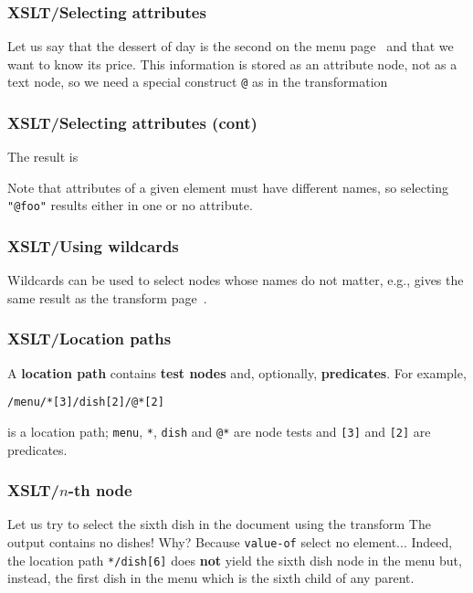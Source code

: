 %
\begin{frame}[containsverbatim]
\frametitle{XSLT/Selecting attributes}
\label{index}

Let us say that the dessert of day is the second on the menu
page~\pageref{menu} and that we want to know its price. This
information is stored as an attribute node, not as a text node, so we
need a special construct \verb|@| as in the transformation

\end{frame}

%
\begin{frame}[containsverbatim]
\frametitle{XSLT/Selecting attributes (cont)}

The result is

\bigskip

Note that attributes of a given element must have different names, so
selecting \verb|"@foo"| results either in one or no attribute.

\end{frame}

%
\begin{frame}
\frametitle{XSLT/Using wildcards}

Wildcards can be used to select nodes whose names do not matter, e.g.,
 gives the same result as the transform
page~\pageref{index}.

\end{frame}

%
\begin{frame}[containsverbatim]
\frametitle{XSLT/Location paths}

A \textbf{location path} contains \textbf{test nodes} and, optionally,
\textbf{predicates}. For example,
\begin{verbatim}
/menu/*[3]/dish[2]/@*[2]
\end{verbatim}
is a location path; \verb|menu|, \verb|*|, \verb|dish| and \verb|@*|
are node tests and \verb|[3]| and \verb|[2]| are predicates.

\end{frame}

%
\begin{frame}[containsverbatim]
\frametitle{XSLT/\(n\)-th node}
 
Let us try to select the sixth dish in the document using 
the transform 
The output contains no dishes! Why? Because \texttt{value-of}
select no element... Indeed, the location path \verb|*/dish[6]| does
\textbf{not} yield the sixth dish node in the menu but, instead, the
first dish in the menu which is the sixth child of any parent.

\end{frame}

